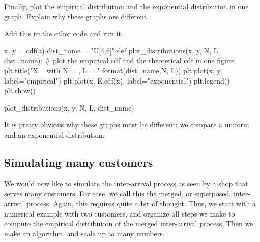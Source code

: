 \begin{exercise}
  Finally, plot the empirical distribution and the exponential distribution in one graph. Explain why these graphs are different.
\begin{solution}
Add this to the other code and run it. 
\begin{pyverbatim}
x, y = cdf(a)
dist_name = "U[4,6]"
def plot_distributions(x, y, N, L, dist_name):
    # plot the empirical cdf and the theoretical cdf in one figure
    plt.title("X ~ {} with N = {}, L = {}".format(dist_name,N, L))
    plt.plot(x, y, label="empirical")
    plt.plot(x, E.cdf(x), label="exponential")
    plt.legend()
    plt.show()

plot_distributions(x, y, N, L, dist_name)	
\end{pyverbatim}

It is pretty obvious why these graphs must be different: we compare a uniform and an exponential distribution. 
\end{solution}
\end{exercise}


\subsection{Simulating many customers}
\label{sec:simul-many-cust}

We would now like to simulate the inter-arrival process as seen by a shop that serves many customers. For ease, we call this the merged, or superposed, inter-arrival process. Again, this requires quite a bit of thought. Thus, we start with a numerical example with two customers, and organize all steps we make to compute the empirical distribution of the merged inter-arrival process. Then we make an algorithm, and scale up to many numbers. 

